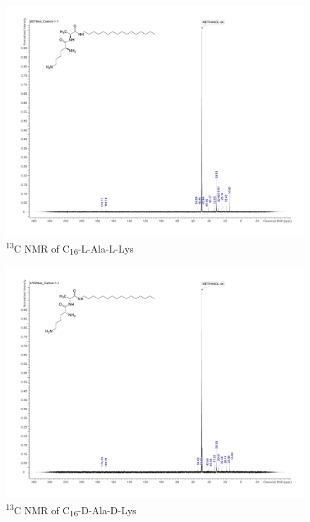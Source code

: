 \begin{figure}[ht!]
\centering
\includegraphics[scale=0.47]{13CNMR/KAT1_19_13C.pdf}
\caption{\textsuperscript{13}C NMR of C\textsubscript{16}-L-Ala-L-Lys}
\label{KAT1.19_13CNMR}
\end{figure}
\newpage
\begin{figure}[ht!]
\centering
\includegraphics[scale=0.47]{13CNMR/KAT1_35_13C.pdf}
\caption{\textsuperscript{13}C NMR of C\textsubscript{16}-D-Ala-D-Lys}
\label{KAT1.35_13CNMR}
\end{figure}

